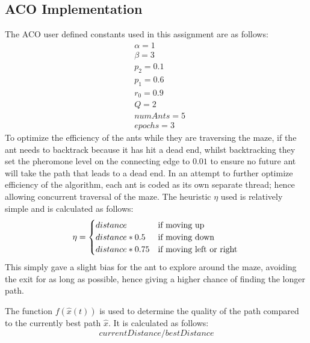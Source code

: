 \documentclass[conference]{IEEEtran}
\begin{document}
    \subsection{ACO Implementation}
        The ACO user defined constants used in this assignment are as follows:
        \begin{align}
           & \alpha = 1\\
           & \beta = 3 \\
           & p_2 = 0.1 \\
           & p_1= 0.6 \\
           & r_0 = 0.9 \\
           & Q = 2 \\
           & numAnts = 5 \\
           & epochs = 3
        \end{align}
        To optimize the efficiency of the ants while they are traversing the maze, if the ant needs to backtrack because it has hit a dead end, whilst backtracking they set the pheromone level on the connecting edge to $0.01$ to ensure no future ant will take the path that leads to a dead end. In an attempt to further optimize efficiency of the algorithm, each ant is coded as its own separate thread; hence allowing concurrent traversal of the maze.
        The heuristic $\eta$ used is relatively simple and is calculated as follows:
        \begin{equation}
            \eta = 
            \begin{cases}
              distance  & \text{if moving up}  \\
              distance * 0.5  & \text{if moving down}  \\
              distance * 0.75      & \text{if moving left or right}  \\
              \end{cases}\\
        \end{equation}
        This simply gave a slight bias for the ant to explore around the maze, avoiding the exit for as long as possible, hence giving a higher chance of finding the longer path.
        
        The function $f(\hat{x}(t))$ is used to determine the quality of the path compared to the currently best path $\hat{x}$. It is calculated as follows:
        \begin{equation}
            currentDistance / bestDistance
        \end{equation}
        
\end{document}
